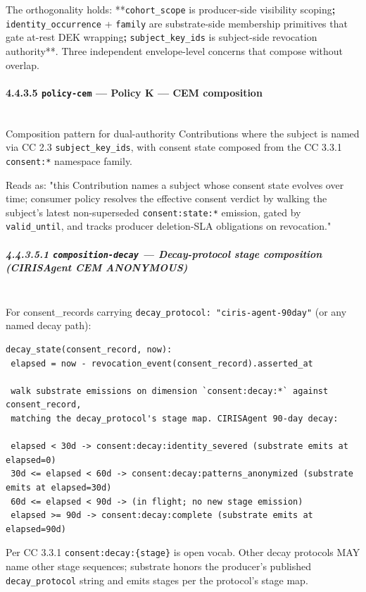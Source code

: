 \documentclass[11pt]{article}
\begin{document}
The orthogonality holds: **\texttt{cohort\_scope} is producer-side visibility scoping\textbf{; }\texttt{identity\_occurrence} + \texttt{family} are substrate-side membership primitives that gate at-rest DEK wrapping\textbf{; }\texttt{subject\_key\_ids} is subject-side revocation authority**. Three independent envelope-level concerns that compose without overlap.


\paragraph{4.4.3.5 \texttt{policy-cem} — Policy K — CEM composition}\mbox{}\\


Composition pattern for dual-authority Contributions where the subject is named via CC 2.3 \texttt{subject\_key\_ids}, with consent state composed from the CC 3.3.1 \texttt{consent:*} namespace family.


Reads as: "this Contribution names a subject whose consent state evolves over time; consumer policy resolves the effective consent verdict by walking the subject's latest non-superseded \texttt{consent:state:*} emission, gated by \texttt{valid\_until}, and tracks producer deletion-SLA obligations on revocation."


\subparagraph{4.4.3.5.1 \texttt{composition-decay} — Decay-protocol stage composition (CIRISAgent CEM ANONYMOUS)}\mbox{}\\


For consent\_records carrying \texttt{decay\_protocol: "ciris-agent-90day"} (or any named decay path):


\begin{lstlisting}
decay_state(consent_record, now):
 elapsed = now - revocation_event(consent_record).asserted_at

 walk substrate emissions on dimension `consent:decay:*` against consent_record,
 matching the decay_protocol's stage map. CIRISAgent 90-day decay:

 elapsed < 30d -> consent:decay:identity_severed (substrate emits at elapsed=0)
 30d <= elapsed < 60d -> consent:decay:patterns_anonymized (substrate emits at elapsed=30d)
 60d <= elapsed < 90d -> (in flight; no new stage emission)
 elapsed >= 90d -> consent:decay:complete (substrate emits at elapsed=90d)
\end{lstlisting}

Per CC 3.3.1 \texttt{consent:decay:\{stage\}} is open vocab. Other decay protocols MAY name other stage sequences; substrate honors the producer's published \texttt{decay\_protocol} string and emits stages per the protocol's stage map.
\end{document}
